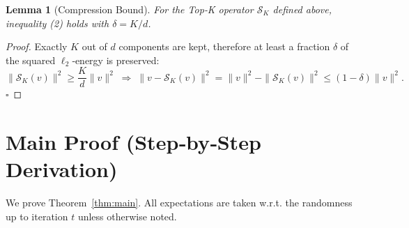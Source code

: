 \documentclass{article}
\newtheorem{lemma}{Lemma}
\newcommand{\cK}{\mathcal{S}_K}
\begin{document}
\begin{lemma}[Compression Bound]\label{lem:comp}
For the Top‑K operator $\cK$ defined above, inequality (2) holds with $\delta=K/d$.
\end{lemma}
\begin{proof}
Exactly $K$ out of $d$ components are kept, therefore at least a fraction $\delta$ of the squared $\ell_{2}$‑energy is preserved:
\[
\|\cK(v)\|^{2}\ge\frac{K}{d}\|v\|^{2}\;\Longrightarrow\;
\|v-\cK(v)\|^{2}= \|v\|^{2}-\|\cK(v)\|^{2}
\le (1-\delta)\|v\|^{2}.
\] \hfill $\square$
\end{proof}

\section*{Main Proof (Step‑by‑Step Derivation)}
We prove Theorem~\ref{thm:main}. All expectations are taken w.r.t. the randomness up to iteration $t$ unless otherwise noted.
\end{document}
